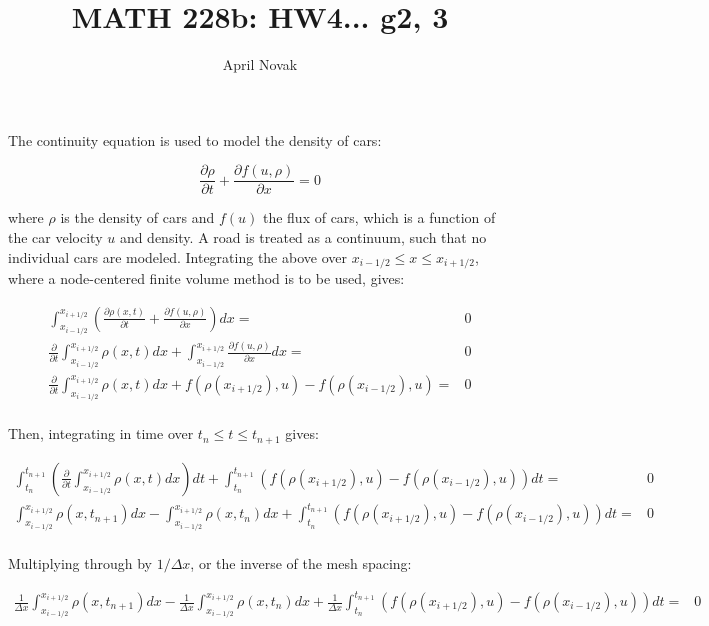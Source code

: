 \documentclass[10pt]{article}
\newcommand{\beq}{\begin{equation}}
\newcommand{\eeq}{\end{equation}}
\newcommand{\beqa}{\begin{equation}\begin{aligned}}
\newcommand{\eeqa}{\end{aligned}\end{equation}}
\begin{document}
\title{MATH 228b: HW4... g2, 3}
\author{April Novak}

\maketitle

\section{}

The continuity equation is used to model the density of cars:

\beq
\frac{\partial\rho}{\partial t}+\frac{\partial f(u, \rho)}{\partial x}=0
\eeq

where \(\rho\) is the density of cars and \(f(u)\) the flux of cars, which is a function of the car velocity \(u\) and density. A road is treated as a continuum, such that no individual cars are modeled. Integrating the above over \(x_{i-1/2}\leq x\leq x_{i+1/2}\), where a node-centered finite volume method is to be used, gives:

\beqa
\int_{x_{i-1/2}}^{x_{i+1/2}}\left(\frac{\partial\rho(x,t)}{\partial t}+\frac{\partial f(u, \rho)}{\partial x}\right)dx=&0\\
\frac{\partial}{\partial t}\int_{x_{i-1/2}}^{x_{i+1/2}}\rho(x,t) dx+\int_{x_{i-1/2}}^{x_{i+1/2}}\frac{\partial f(u, \rho)}{\partial x}dx=&0\\
\frac{\partial}{\partial t}\int_{x_{i-1/2}}^{x_{i+1/2}}\rho(x,t) dx+f(\rho(x_{i+1/2}), u)-f(\rho(x_{i-1/2}), u)=&0\\
\eeqa

Then, integrating in time over \(t_{n}\leq t\leq t_{n+1}\) gives:

\beqa
\int_{t_n}^{t_{n+1}}\left(\frac{\partial}{\partial t}\int_{x_{i-1/2}}^{x_{i+1/2}}\rho(x,t) dx\right)dt+\int_{t_n}^{t_{n+1}}\left(f(\rho(x_{i+1/2}), u)-f(\rho(x_{i-1/2}), u)\right)dt=&0\\
\int_{x_{i-1/2}}^{x_{i+1/2}}\rho(x, t_{n+1}) dx-\int_{x_{i-1/2}}^{x_{i+1/2}}\rho(x, t_{n}) dx+\int_{t_n}^{t_{n+1}}\left(f(\rho(x_{i+1/2}), u)-f(\rho(x_{i-1/2}), u)\right)dt=&0\\
\eeqa

Multiplying through by \(1/\Delta x\), or the inverse of the mesh spacing:

\beqa
\label{eq:1}
\frac{1}{\Delta x}\int_{x_{i-1/2}}^{x_{i+1/2}}\rho(x, t_{n+1}) dx-\frac{1}{\Delta x}\int_{x_{i-1/2}}^{x_{i+1/2}}\rho(x, t_{n}) dx+\frac{1}{\Delta x}\int_{t_n}^{t_{n+1}}\left(f(\rho(x_{i+1/2}), u)-f(\rho(x_{i-1/2}), u)\right)dt=&0\\
\eeqa
\end{document}
